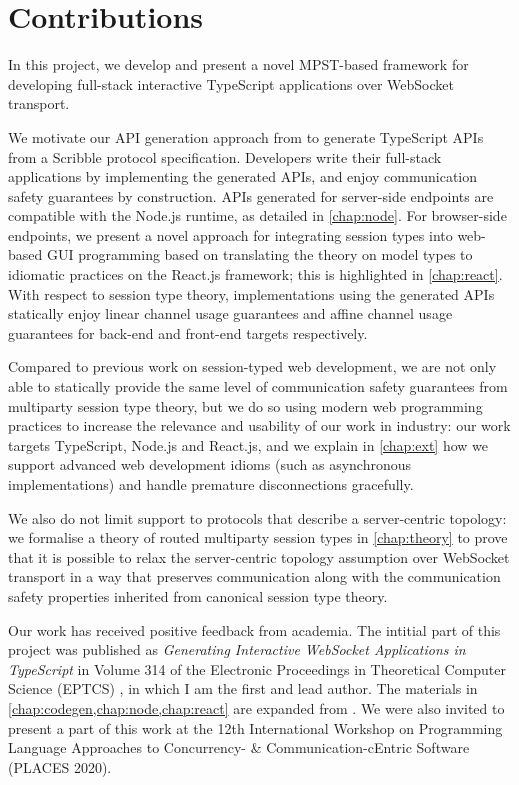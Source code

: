 \section{Contributions}

In this project, we develop and present a novel
MPST-based framework for developing full-stack
interactive TypeScript applications over WebSocket transport.

We motivate our API generation approach from 
\cite{Hybrid2016,PureScript2019} to generate TypeScript APIs
from a Scribble protocol specification.
Developers write their full-stack applications
by implementing the generated APIs, and enjoy 
communication safety guarantees by construction.
APIs generated for server-side endpoints
are compatible with the Node.js runtime,
as detailed in \cref{chap:node}.
For browser-side endpoints,
we present a novel approach for integrating
session types into web-based GUI programming based on
translating the theory on model types \cite{MVU2020}
to idiomatic practices on the React.js framework;
this is highlighted in \cref{chap:react}.
With respect to session type theory, implementations using
the generated APIs statically enjoy linear channel usage
guarantees and affine channel usage guarantees for back-end
and front-end targets respectively.

Compared to previous work 
\cite{Exceptional,PureScript2019,MVU2020,LINKS} on
session-typed web development, 
we are not only able to
statically provide the same level of communication safety
guarantees from multiparty session type theory, but we do so
using modern web programming practices to increase
the relevance and usability of our work in industry:
our work targets TypeScript, Node.js and React.js,
and we explain in \cref{chap:ext} how we support advanced
web development idioms (such as asynchronous implementations)
and handle premature disconnections gracefully.

We also do not limit support to protocols that describe
a server-centric topology: we formalise 
a theory of routed multiparty session types in 
\cref{chap:theory} to prove that it is possible to relax the
server-centric topology assumption over WebSocket transport in a way 
that preserves communication along with the communication safety 
properties inherited from canonical session type theory.

Our work has received positive feedback from academia.
The intitial part of this project was published as 
\emph{Generating Interactive WebSocket 
Applications in TypeScript} in Volume 314 of the Electronic Proceedings
in Theoretical Computer Science (EPTCS) \cite{PLACES2020},
in which I am the first and lead author.
The materials in \cref{chap:codegen,chap:node,chap:react}
are expanded from \cite{PLACES2020}.
We were also invited to present a part of this work
at the 12th International Workshop on
Programming Language Approaches to Concurrency- \& 
Communication-cEntric Software (PLACES 2020).

